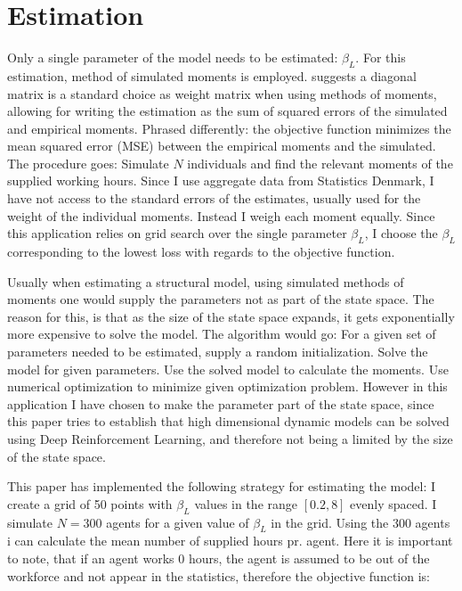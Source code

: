 \section{Estimation}

Only a single parameter of the model needs to be estimated: $\beta_L$. For this estimation, method of simulated moments is employed.  \textcite{eisenhauer_estimation_2015} suggests a diagonal matrix is a standard choice as weight matrix when using methods of moments, allowing for writing the estimation as the sum of squared errors of the simulated and empirical moments. Phrased differently: the objective function minimizes the mean squared error (MSE) between the empirical moments and the simulated. The procedure goes: Simulate $N$ individuals and find the relevant moments of the supplied working hours. Since I use aggregate data from Statistics Denmark, I have not access to the standard errors of the estimates, usually used for the weight of the individual moments. Instead I weigh each moment equally. Since this application relies on grid search over the single parameter $\beta_L$, I choose the $\beta_L$ corresponding to the lowest loss with regards to the objective function. 

Usually when estimating a structural model, using simulated methods of moments one would supply the parameters not as part of the state space. The reason for this, is that as the size of the state space expands, it gets exponentially more expensive to solve the model. The algorithm would go: For a given set of parameters needed to be estimated, supply a random initialization. Solve the model for given parameters. Use the solved model to calculate the moments. Use numerical optimization to minimize given optimization problem. However in this application I have chosen to make the parameter part of the state space, since this paper tries to establish that high dimensional dynamic models can be solved using Deep Reinforcement Learning, and therefore not being a limited by the size of the state space.

This paper has implemented the following strategy for estimating the model: I create a grid of 50 points with $\beta_L$ values in the range $[0.2, 8]$ evenly spaced. I simulate $N=300$ agents for a given value of $\beta_L$ in the grid. Using the 300 agents i can calculate the mean number of supplied hours pr. agent. Here it is important to note, that if an agent works 0 hours, the agent is assumed to be out of the workforce and not appear in the statistics, therefore the objective function is:

